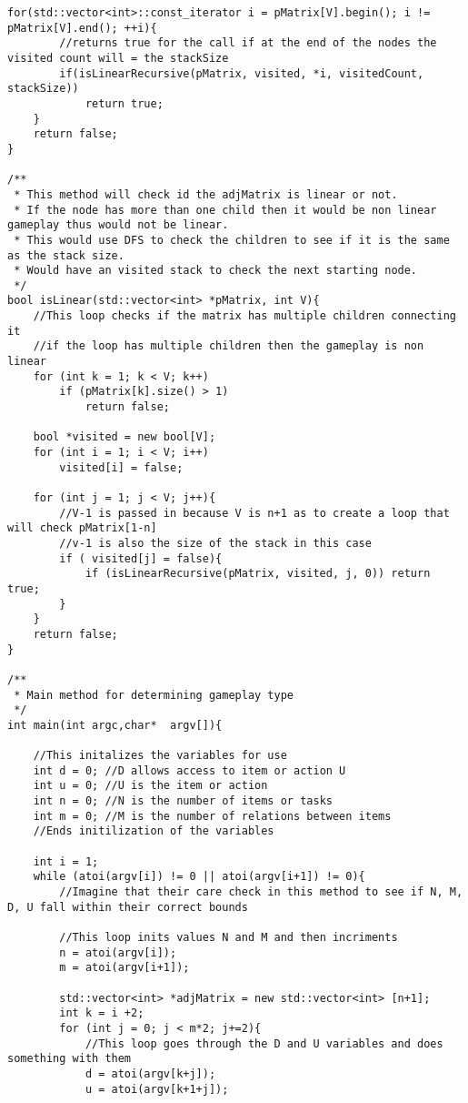 \documentclass[11pt]{article}
\begin{document}
\begin{lstlisting}[frame=single]
    for(std::vector<int>::const_iterator i = pMatrix[V].begin(); i != pMatrix[V].end(); ++i){
        //returns true for the call if at the end of the nodes the visited count will = the stackSize
        if(isLinearRecursive(pMatrix, visited, *i, visitedCount, stackSize))
            return true;   
    }
    return false;             
}

/**
 * This method will check id the adjMatrix is linear or not.
 * If the node has more than one child then it would be non linear gameplay thus would not be linear.
 * This would use DFS to check the children to see if it is the same as the stack size.
 * Would have an visited stack to check the next starting node.
 */
bool isLinear(std::vector<int> *pMatrix, int V){
    //This loop checks if the matrix has multiple children connecting it 
    //if the loop has multiple children then the gameplay is non linear    
    for (int k = 1; k < V; k++)
        if (pMatrix[k].size() > 1) 
            return false;
    
    bool *visited = new bool[V];
    for (int i = 1; i < V; i++) 
        visited[i] = false;

    for (int j = 1; j < V; j++){
        //V-1 is passed in because V is n+1 as to create a loop that will check pMatrix[1-n] 
        //v-1 is also the size of the stack in this case
        if ( visited[j] = false){            
            if (isLinearRecursive(pMatrix, visited, j, 0)) return true;
        }
    }
    return false;      
}

/**
 * Main method for determining gameplay type
 */
int main(int argc,char*  argv[]){

    //This initalizes the variables for use
    int d = 0; //D allows access to item or action U
    int u = 0; //U is the item or action 
    int n = 0; //N is the number of items or tasks
    int m = 0; //M is the number of relations between items
    //Ends initilization of the variables
    
    int i = 1;
    while (atoi(argv[i]) != 0 || atoi(argv[i+1]) != 0){
        //Imagine that their care check in this method to see if N, M, D, U fall within their correct bounds
        
        //This loop inits values N and M and then incriments 
        n = atoi(argv[i]);
        m = atoi(argv[i+1]);
        
        std::vector<int> *adjMatrix = new std::vector<int> [n+1];
        int k = i +2;
        for (int j = 0; j < m*2; j+=2){
            //This loop goes through the D and U variables and does something with them
            d = atoi(argv[k+j]);
            u = atoi(argv[k+1+j]);
            

\end{lstlisting}
\end{document}
